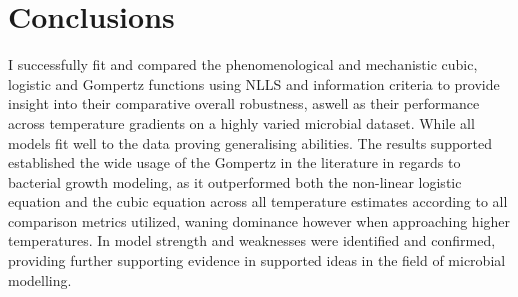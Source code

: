 \documentclass[11pt]{article}
\begin{document}
\section{Conclusions}
I successfully fit and compared the phenomenological and mechanistic cubic, logistic and Gompertz functions using NLLS and information criteria to provide insight into their comparative overall robustness, aswell as their performance across temperature gradients on a highly varied microbial dataset. While all models fit well to the data proving generalising abilities. The results supported established the wide usage of the Gompertz in the literature in regards to bacterial growth modeling, as it outperformed both the non-linear logistic equation and the cubic equation across all temperature estimates according to all comparison metrics utilized, waning dominance however when approaching higher temperatures. In model strength and weaknesses were identified and confirmed, providing further supporting evidence in supported ideas in the field of microbial modelling. 


\pagebreak


\end{document}
